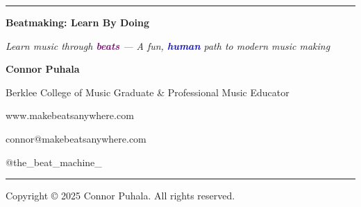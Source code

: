 \documentclass[11pt,letterpaper]{article}
\newcommand{\purple}[1]{\textcolor{purple}{\textbf{#1}}}
\newcommand{\bluepurple}[1]{\textcolor{blue}{\textbf{#1}}}
\begin{document}
\begin{center}
\rule{0.8\textwidth}{0.5pt}

\vspace{0.5cm}

{\Large\textbf{Beatmaking: Learn By Doing}}

\vspace{0.3cm}

\textit{Learn music through \purple{beats} — A fun, \bluepurple{human} path to modern music making}

\vspace{0.5cm}

\textbf{Connor Puhala}

Berklee College of Music Graduate \& Professional Music Educator

\vspace{0.3cm}

www.makebeatsanywhere.com

connor@makebeatsanywhere.com

@the\_beat\_machine\_

\vspace{0.5cm}

\rule{0.8\textwidth}{0.5pt}

\vspace{0.3cm}

{\small Copyright © 2025 Connor Puhala. All rights reserved.}
\end{center}
\end{document}
